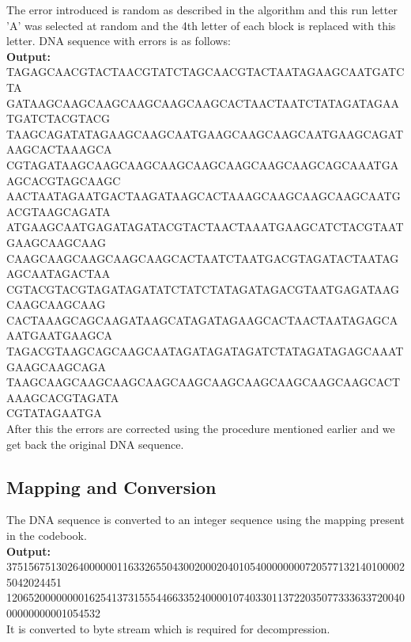 \documentclass[11pt]{article}
\begin{document}
The error introduced is random as described in the algorithm and this run letter 'A' was selected at random and the 4th letter of each block is replaced with this letter. DNA sequence with errors is as follows: \\

\textbf{Output:} TAGAGCAACGTACTAACGTATCTAGCAACGTACTAATAGAAGCAATGATCTA \\ GATAAGCAAGCAAGCAAGCAAGCAAGCACTAACTAATCTATAGATAGAATGATCTACGTACG \\ TAAGCAGATATAGAAGCAAGCAATGAAGCAAGCAAGCAATGAAGCAGATAAGCACTAAAGCA \\ CGTAGATAAGCAAGCAAGCAAGCAAGCAAGCAAGCAAGCAGCAAATGAAGCACGTAGCAAGC \\ AACTAATAGAATGACTAAGATAAGCACTAAAGCAAGCAAGCAAGCAATGACGTAAGCAGATA \\ ATGAAGCAATGAGATAGATACGTACTAACTAAATGAAGCATCTACGTAATGAAGCAAGCAAG \\ CAAGCAAGCAAGCAAGCAAGCACTAATCTAATGACGTAGATACTAATAGAGCAATAGACTAA \\ CGTACGTACGTAGATAGATATCTATCTATAGATAGACGTAATGAGATAAGCAAGCAAGCAAG \\ CACTAAAGCAGCAAGATAAGCATAGATAGAAGCACTAACTAATAGAGCAAATGAATGAAGCA \\ TAGACGTAAGCAGCAAGCAATAGATAGATAGATCTATAGATAGAGCAAATGAAGCAAGCAGA \\ TAAGCAAGCAAGCAAGCAAGCAAGCAAGCAAGCAAGCAAGCAAGCACTAAAGCACGTAGATA \\ CGTATAGAATGA
\\

After this the errors are corrected using the procedure mentioned earlier and we get back the original DNA sequence.

\subsection{Mapping and Conversion}

The DNA sequence is converted to an integer sequence using the mapping present in the codebook. \\

\textbf{Output:} 3751567513026400000011633265504300200020401054000000007205771321401000025042024451 \\ 12065200000000162541373155544663352400001074033011372203507733363372004000000000001054532
\\

It is converted to byte stream which is required for decompression. \\
\end{document}
